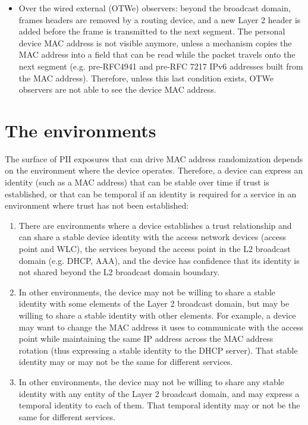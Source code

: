 \documentclass[10pt]{article}
\begin{document}
{{\begin{itemize}
    \item Over the wired external (OTWe) observers: beyond the broadcast domain, frames headers are removed by a routing device, and a new Layer 2 header is added before the frame is transmitted to the next segment. The personal device MAC address is not visible anymore, unless a mechanism copies the MAC address into a field that can be read while the packet travels onto the next segment (e.g. pre-RFC4941 and pre-RFC 7217 IPv6 addresses built from the MAC address). Therefore, unless this last condition exists, OTWe observers are not able to see the device MAC address.
\end{itemize}
}

\section{The environments}
The surface of PII exposures that can drive MAC address randomization depends on the environment where the device operates. Therefore, a device can express an identity (such as a MAC address) that can be stable over time if trust is established, or that can be temporal if an identity is required for a service in an environment where trust has not been established:
\begin{enumerate}
\item There are environments where a device establishes a trust relationship and can share a stable device identity with the access network devices (access point and WLC), the services beyond the access point in the L2 broadcast domain (e.g. DHCP, AAA), and the device has confidence that its identity is not shared beyond the L2 broadcast domain boundary. 
\item In other environments, the device may not be willing to share a stable identity with some elements of the Layer 2 broadcast domain, but may be willing to share a stable identity with other elements. For example, a device may want to change the MAC address it uses to communicate with the access point while maintaining the same IP address across the MAC address rotation (thus expressing a stable identity to the DHCP server). That stable identity may or may not be the same for different services.
\item In other environments, the device may not be willing to share any stable identity with any entity of the Layer 2 broadcast domain, and may express a temporal identity to each of them. That temporal identity may or not be the same for different services.
\end{enumerate}

}
\end{document}
